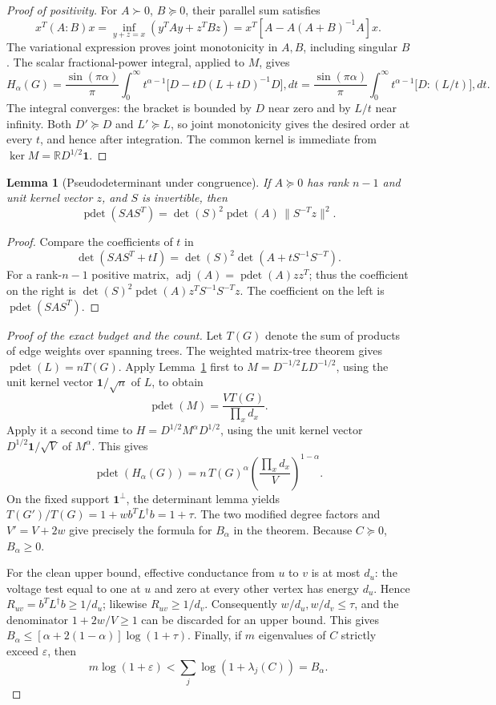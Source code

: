 \documentclass[11pt]{article}
\newtheorem{lemma}{Lemma}
\newcommand{\R}{\mathbb R}
\newcommand{\pdet}{\operatorname{pdet}}
\begin{document}
\begin{proof}[Proof of positivity]
For $A\succ0$, $B\succeq0$, their parallel sum satisfies
\[
 x^T(A:B)x=\inf_{y+z=x}(y^TAy+z^TBz)
 =x^T[A-A(A+B)^{-1}A]x.
\]
The variational expression proves joint monotonicity in $A,B$, including
singular $B$. The scalar fractional-power integral, applied to $M$, gives
\[
 H_\alpha(G)
 =\frac{\sin(\pi\alpha)}\pi
 \int_0^\infty t^{\alpha-1}
 \bigl[D-tD(L+tD)^{-1}D\bigr],dt
 =\frac{\sin(\pi\alpha)}\pi
 \int_0^\infty t^{\alpha-1}\bigl[D:(L/t)\bigr],dt.
\]
The integral converges: the bracket is bounded by $D$ near zero and by
$L/t$ near infinity. Both $D'\succeq D$ and $L'\succeq L$, so joint
monotonicity gives the desired order at every $t$, and hence after
integration. The common kernel is immediate from $\ker M=\R D^{1/2}\mathbf1$.
\end{proof}

\begin{lemma}[Pseudodeterminant under congruence]
\label{lem:pdet}
If $A\succeq0$ has rank $n-1$ and unit kernel vector $z$, and $S$ is
invertible, then
\[
 \pdet(SAS^T)=\det(S)^2\pdet(A)\,\|S^{-T}z\|^2.
\]
\end{lemma}
\begin{proof}
Compare the coefficients of $t$ in
\[
 \det(SAS^T+tI)=\det(S)^2\det(A+tS^{-1}S^{-T}).
\]
For a rank-$n-1$ positive matrix,
$\operatorname{adj}(A)=\pdet(A)zz^T$; thus the coefficient on the right
is $\det(S)^2\pdet(A)z^TS^{-1}S^{-T}z$. The coefficient on the left is
$\pdet(SAS^T)$.
\end{proof}

\begin{proof}[Proof of the exact budget and the count]
Let $T(G)$ denote the sum of products of edge weights over spanning trees.
The weighted matrix-tree theorem gives $\pdet(L)=nT(G)$.
Apply Lemma~\ref{lem:pdet} first to $M=D^{-1/2}LD^{-1/2}$, using the
unit kernel vector $\mathbf1/\sqrt n$ of $L$, to obtain
\[
 \pdet(M)=\frac{VT(G)}{\prod_x d_x}.
\]
Apply it a second time to $H=D^{1/2}M^\alpha D^{1/2}$, using the unit
kernel vector $D^{1/2}\mathbf1/\sqrt V$ of $M^\alpha$. This gives
\[
 \boxed{\displaystyle
 \pdet(H_\alpha(G))=
 n\,T(G)^\alpha\left(\frac{\prod_xd_x}{V}\right)^{1-\alpha}.}
\]
On the fixed support $\mathbf1^\perp$, the determinant lemma yields
$T(G')/T(G)=1+wb^TL^\dagger b=1+\tau$. The two modified degree factors
and $V'=V+2w$ give precisely the formula for $B_\alpha$ in the theorem.
Because $C\succeq0$, $B_\alpha\ge0$.

For the clean upper bound, effective conductance from $u$ to $v$ is at
most $d_u$: the voltage test equal to one at $u$ and zero at every other
vertex has energy $d_u$. Hence $R_{uv}=b^TL^\dagger b\ge1/d_u$;
likewise $R_{uv}\ge1/d_v$. Consequently $w/d_u,w/d_v\le\tau$, and
the denominator $1+2w/V\ge1$ can be discarded for an upper bound.
This gives $B_\alpha\le[\alpha+2(1-\alpha)]\log(1+\tau)$.
Finally, if $m$ eigenvalues of $C$ strictly exceed $\varepsilon$, then
\[
 m\log(1+\varepsilon)
 <\sum_j\log(1+\lambda_j(C))=B_\alpha.
\]
\end{proof}
\end{document}
